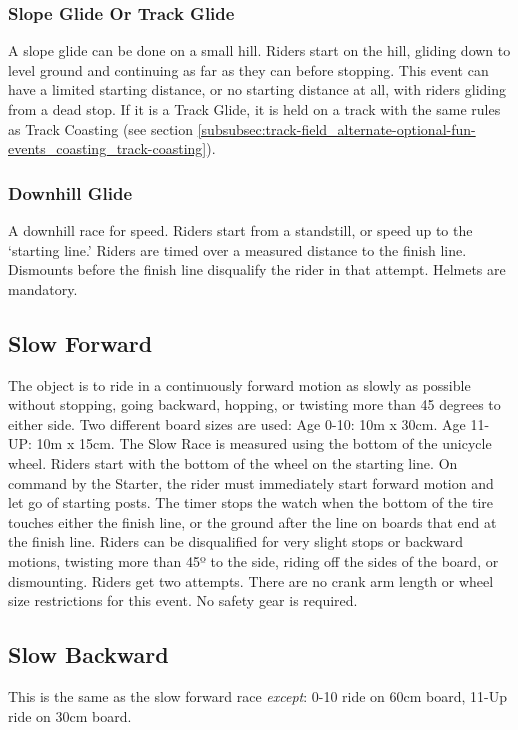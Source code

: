 \subsubsection{Slope Glide Or Track Glide}
A slope glide can be done on a small hill.
Riders start on the hill, gliding down to level ground and continuing as far as they can before stopping.
This event can have a limited starting distance, or no starting distance at all, with riders gliding from a dead stop.
If it is a Track Glide, it is held on a track with the same rules as Track Coasting (see section \ref{subsubsec:track-field_alternate-optional-fun-events_coasting_track-coasting}).

\subsubsection{Downhill Glide}
A downhill race for speed.
Riders start from a standstill, or speed up to the ‘starting line.' Riders are timed over a measured distance to the finish line.
Dismounts before the finish line disqualify the rider in that attempt.
Helmets are mandatory.

\subsection{Slow Forward}
The object is to ride in a continuously forward motion as slowly as possible without stopping, going backward, hopping, or twisting more than 45 degrees to either side.
Two different board sizes are used: Age 0-10: 10m x 30cm.
Age 11-UP: 10m x 15cm.
The Slow Race is measured using the bottom of the unicycle wheel.
Riders start with the bottom of the wheel on the starting line.
On command by the Starter, the rider must immediately start forward motion and let go of starting posts.
The timer stops the watch when the bottom of the tire touches either the finish line, or the ground after the line on boards that end at the finish line.
Riders can be disqualified for very slight stops or backward motions, twisting more than 45º to the side, riding off the sides of the board, or dismounting.
Riders get two attempts.
There are no crank arm length or wheel size restrictions for this event.
No safety gear is required.

\subsection{Slow Backward}
This is the same as the slow forward race \textit{except}: 0-10 ride on 60cm board, 11-Up ride on 30cm board.

